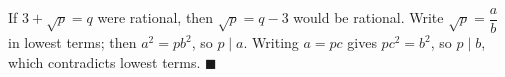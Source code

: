If $3+\sqrt p=q$ were rational, then $\sqrt p=q-3$ would be rational. Write $\sqrt p=\dfrac ab$ in lowest terms; then $a^2=pb^2$, so $p\mid a$. Writing $a=pc$ gives $pc^2=b^2$, so $p\mid b$, which contradicts lowest terms. $\blacksquare$
